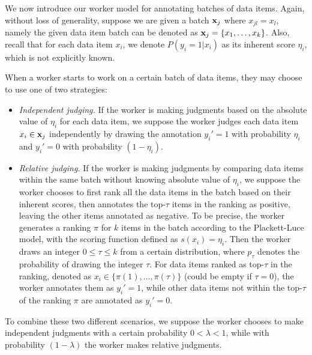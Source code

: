 %

We now introduce our worker model for annotating batches of data items.
Again, without loss of generality, suppose we are given a batch ${\mathbf{x}}_j$ where $x_{jl} = x_l$,
namely the given data item batch can be denoted as ${\mathbf{x}}_j=\{x_1, \ldots, x_k\}$.
Also, recall that for each data item $x_i$, we denote $P(y_i = 1 | x_i)$ as its inherent score $\eta_i$,
which is not explicitly known. 

When a worker starts to work on a certain batch of data items,
they may choose to use one of two strategies:
\begin{itemize}
  \item \emph{Independent judging.}
  If the worker is making judgments based on the absolute value of $\eta_i$ for each data item, 
  we suppose the worker judges each data item $x_i \in {\mathbf{x}}_j$ independently
  by drawing the annotation $y_i'=1$ with probability $\eta_i$ and $y_i' = 0$ with probability $(1 - \eta_i)$.
  \item \emph{Relative judging.}
  If the worker is making judgments by comparing data items within the same batch
  without knowing absolute value of $\eta_i$,
  we suppose the worker chooses to first rank all the data items in the batch based on their inherent scores,
  then annotates the top-$\tau$ items in the ranking as positive, leaving the other items annotated as negative.
  To be precise, the worker generates a ranking $\pi$ for $k$ items in the batch according to the Plackett-Luce model,
  with the scoring function defined as $s(x_i) = \eta_i$.
  Then the worker draws an integer $0 \leq \tau \leq k$ from a certain distribution,
  where $p_\tau$ denotes the probability of drawing the integer $\tau$.
  For data items ranked as top-$\tau$ in the ranking,
  denoted as $x_i \in \{\pi(1), \ldots, \pi(\tau)\}$ (could be empty if $\tau = 0$),
  the worker annotates them as $y_i'=1$,
  while other data items not within the top-$\tau$ of the ranking $\pi$ are annotated as $y_i' = 0$.
\end{itemize}
To combine these two different scenarios,
we suppose the worker chooses to make independent judgments with a certain probability $0 < \lambda < 1$,
while with probability $(1-\lambda)$ the worker makes relative judgments.

